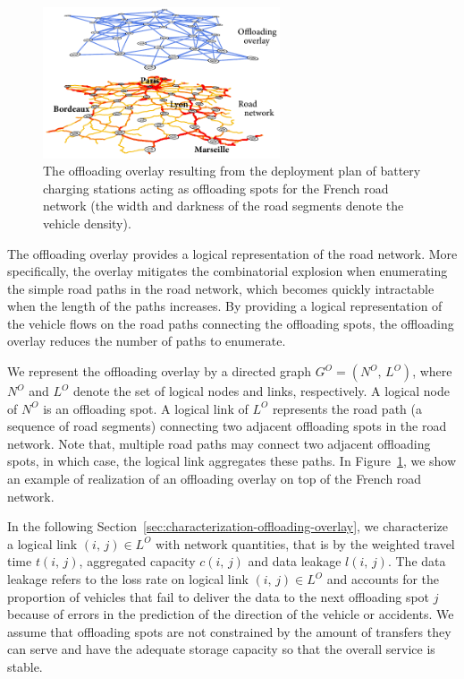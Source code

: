 \begin{figure}
    \includegraphics[width=7cm]{figures/France-overlay-1.pdf}
    \caption{The offloading overlay resulting from the deployment plan of battery charging stations acting as offloading spots for the French road network (the width and darkness of the road segments denote the vehicle density).}
    \label{fig:France-overlay}
\end{figure}
The offloading overlay provides a logical representation of the road network. More specifically, the overlay mitigates the combinatorial explosion when enumerating the simple road paths in the road network, which becomes quickly intractable when the length of the paths increases. By providing a logical representation of the vehicle flows on the road paths connecting the offloading spots, the offloading overlay reduces the number of paths to enumerate. 

We represent the offloading overlay by a directed graph $G^O=(N^O,\,L^O)$, where $N^{O}$ and $L^{O}$ denote the set of logical nodes and links, respectively. A logical node of $N^{O}$ is an offloading spot. A logical link of $L^{O}$ represents the road path (\ie a sequence of road segments) connecting two adjacent offloading spots in the road network. Note that, multiple road paths may connect two adjacent offloading spots, in which case, the logical link aggregates these paths. In Figure~\ref{fig:France-overlay}, we show an example of realization of an offloading overlay on top of the French road network. 

In the following Section~\ref{sec:characterization-offloading-overlay}, we characterize a logical link $(i,\,j)\in L^{O}$ with network quantities, that is by the weighted travel time $t(i,\,j)$, aggregated capacity $c(i,\,j)$ and data leakage $l(i,\,j)$. The data leakage refers to the loss rate on logical link $(i,\,j)\in L^{O}$ and accounts for the proportion of vehicles that fail to deliver the data to the next offloading spot $j$ because of errors in the prediction of the direction of the vehicle or accidents. We assume that offloading spots are not constrained by the amount of transfers they can serve and have the adequate storage capacity so that the overall service is stable. 


